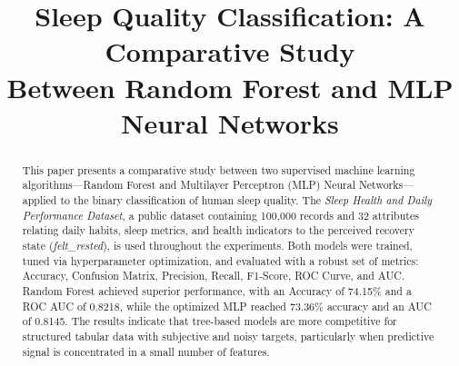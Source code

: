 \documentclass[conference]{IEEEtran}
\begin{document}
\title{Sleep Quality Classification: A Comparative Study\\
       Between Random Forest and MLP Neural Networks}

\author{
\and
{}
\and
{}
\and
{}
\and
{}
}


\maketitle

\begin{abstract}
This paper presents a comparative study between two supervised machine learning algorithms---Random Forest and Multilayer Perceptron (MLP) Neural Networks---applied to the binary classification of human sleep quality. The \textit{Sleep Health and Daily Performance Dataset}, a public dataset containing 100,000 records and 32 attributes relating daily habits, sleep metrics, and health indicators to the perceived recovery state (\textit{felt\_rested}), is used throughout the experiments. Both models were trained, tuned via hyperparameter optimization, and evaluated with a robust set of metrics: Accuracy, Confusion Matrix, Precision, Recall, F1-Score, ROC Curve, and AUC. Random Forest achieved superior performance, with an Accuracy of 74.15\% and a ROC AUC of 0.8218, while the optimized MLP reached 73.36\% accuracy and an AUC of 0.8145. The results indicate that tree-based models are more competitive for structured tabular data with subjective and noisy targets, particularly when predictive signal is concentrated in a small number of features.
\end{abstract}
\end{document}
